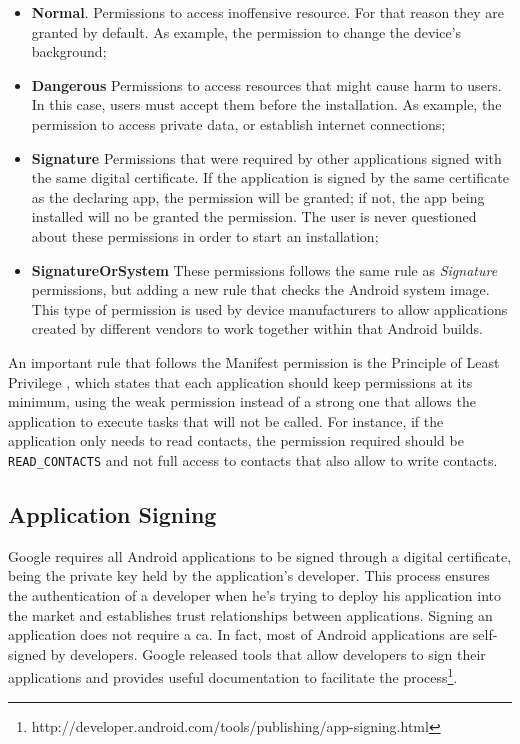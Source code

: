 \begin{itemize}
 \item \textbf{Normal}. Permissions to access inoffensive resource. For that reason they are granted by default. As example, the permission to change the device's background;

 \item \textbf{Dangerous} Permissions to access resources that might cause harm to users. In this case, users must accept them before the installation. As example, the permission to access 
private data, or establish internet connections;

\item \textbf{Signature} Permissions that were required by other applications signed with the same digital certificate. If the application is signed by the same certificate as the declaring app, the permission will be granted; if not, the app being installed will no be granted the permission. The user is never questioned about these permissions in order to start an installation;

\item \textbf{SignatureOrSystem} These permissions follows the same rule as \textit{Signature} permissions, but adding a new rule that checks the Android system image. This type of permission is used by device manufacturers to allow applications created by different vendors to work together within that Android builds.
\end{itemize}


An important rule that follows the Manifest permission is the Principle of Least Privilege \cite{ApplicationSecurity:Oreilly}, which states that each application should keep permissions at its minimum, using the weak permission instead of a strong one that allows the application to execute tasks that will not be called. For instance, if the application only needs to read contacts, the permission required should be \texttt{READ\_CONTACTS} and not full access to contacts that also allow to write contacts.

\subsection{Application Signing}

Google requires all Android applications to be signed through a digital certificate, being the private key held by the application's developer. This process ensures the authentication of a developer when he's trying to deploy his application into the market and establishes trust relationships between applications. Signing an application does not require a \gls{ca}. In fact, most of Android applications are self-signed by developers. Google released tools that allow developers to sign their applications and provides useful documentation to facilitate the process\footnote{http://developer.android.com/tools/publishing/app-signing.html}.



